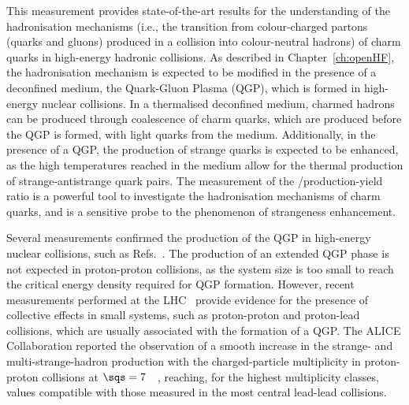 This measurement provides state-of-the-art results for the understanding of the hadronisation mechanisms (i.e., the transition from colour-charged partons (quarks and gluons) produced in a collision into colour-neutral hadrons) of charm quarks in high-energy hadronic collisions. As described in Chapter~\ref{ch:openHF}, the hadronisation mechanism is expected to be modified in the presence of a deconfined medium, the Quark-Gluon Plasma (QGP), which is formed in high-energy nuclear collisions. In a thermalised deconfined medium, charmed hadrons can be produced through coalescence of charm quarks, which are produced before the QGP is formed, with light quarks from the medium. Additionally, in the presence of a QGP, the production of strange quarks is expected to be enhanced, as the high temperatures reached in the medium allow for the thermal production of strange-antistrange quark pairs. The measurement of the \ds/\dpl production-yield ratio is a powerful tool to investigate the hadronisation mechanisms of charm quarks, and is a sensitive probe to the phenomenon of strangeness enhancement. 

Several measurements confirmed the production of the QGP in high-energy nuclear collisions, such as Refs.~\cite{NA50:1997hlx,WA97:2000apo,ALICE:2018vuu}. The production of an extended QGP phase is not expected in proton-proton collisions, as the system size is too small to reach the critical energy density required for QGP formation. However, recent measurements performed at the LHC~\cite{CMS:2016fnw,CMS:2010ifv,ALICE:2019zfl} provide evidence for the presence of collective effects in small systems, such as proton-proton and proton-lead collisions, which are usually associated with the formation of a QGP. The ALICE Collaboration reported the observation of a smooth increase in the strange- and multi-strange-hadron production with the charged-particle multiplicity in proton-proton collisions at $\sqs=7$~\tev~\cite{ALICE:2016fzo}, reaching, for the highest multiplicity classes, values compatible with those measured in the most central lead-lead collisions. 

